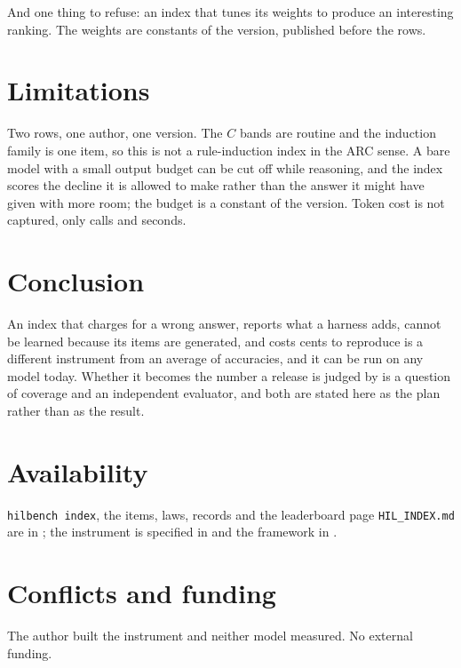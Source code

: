 And one thing to refuse: an index that tunes its weights to produce an interesting ranking. The weights are constants of the version, published before the rows.

\section{Limitations}\label{sec:limits}

Two rows, one author, one version. The $C$ bands are routine and the induction family is one item, so this is not a rule-induction index in the ARC sense. A bare model with a small output budget can be cut off while reasoning, and the index scores the decline it is allowed to make rather than the answer it might have given with more room; the budget is a constant of the version. Token cost is not captured, only calls and seconds.

\section{Conclusion}

An index that charges for a wrong answer, reports what a harness adds, cannot be learned because its items are generated, and costs cents to reproduce is a different instrument from an average of accuracies, and it can be run on any model today. Whether it becomes the number a release is judged by is a question of coverage and an independent evaluator, and both are stated here as the plan rather than as the result.

\section*{Availability}

\texttt{hilbench index}, the items, laws, records and the leaderboard page \texttt{HIL\_INDEX.md} are in \citet{yang2026hilbench}; the instrument is specified in \citet{yang2026hilbenchpaper} and the framework in \citet{yang2026unified}.

\section*{Conflicts and funding}

The author built the instrument and neither model measured. No external funding.
